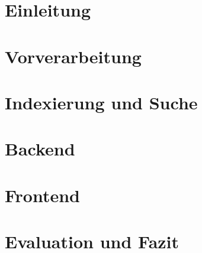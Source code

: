 




\pagestyle{empty} %



\pagestyle{useheadings} %
\setcounter{tocdepth}{3}    %
\setcounter{secnumdepth}{3} %

\tableofcontents %







\chapter{Einleitung}\label{ch:intro}


\chapter{Vorverarbeitung}\label{ch:prepros}


\chapter{Indexierung und Suche}\label{ch:indexing}


\chapter{Backend}\label{ch:backend}


\chapter{Frontend}\label{ch:frontend} 
 

\chapter{Evaluation und Fazit}\label{ch:results}





